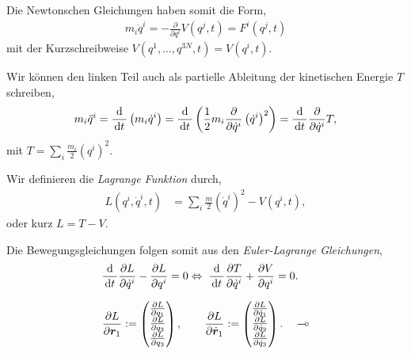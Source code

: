 Die Newtonschen Gleichungen haben somit die Form,
\begin{align*}
m_i\ddot{q}^i  = -\frac{\partial}{\partial q^i} V(q^j,t) = F^i(q^j,t)
\end{align*}
mit der  Kurzschreibweise $V(q^1,\ldots,q^{3N},t) = V(q^i,t)$.

Wir können den linken Teil auch als partielle Ableitung der kinetischen Energie
$T$ schreiben,
\begin{align*}
m_i \ddot{q}^i = \frac{\mathrm{d}}{\,\mathrm{d} t\,}\left(m_i \dot{q}^i\right)
= \frac{\mathrm{d}}{\,\mathrm{d} t\,}\left(\frac{1}{2}m_i
\frac{\partial}{\partial \dot{q}^i}\left(\dot{q}^i\right)^2\right)
= \frac{\mathrm{d}}{\,\mathrm{d} t\,}\frac{\partial}{\partial \dot{q}^i}T,
\end{align*}
mit $T = \sum_i \frac{m_i}{2}\left(q^i\right)^2$.

Wir definieren die \emph{Lagrange Funktion} durch,
\begin{align*}
L(q^i,\dot{q}^i,t) &= \sum_i \frac{m}{2} \left(\dot{q}^i\right)^2 - V(q^i,t),
\end{align*}
oder kurz $L=T-V$.

Die Bewegungsgleichungen folgen somit aus den \emph{Euler-Lagrange
Gleichungen},
\begin{align*}
&\frac{\mathrm{d}}{\,\mathrm{d} t\,}\frac{\partial L}{\partial \dot{q}^i} - \frac{\partial L
}{\partial q^i} = 0 \Leftrightarrow\; \frac{\mathrm{d}}{\,\mathrm{d} t\,}\frac{\partial T}{\partial\dot{q}^i} +
\frac{\partial V}{\partial q^i} = 0.
\end{align*}

\begin{bemn}
\begin{align*}
\frac{\partial L}{\partial \bm{r}_1} :=
\begin{pmatrix}
\frac{\partial L}{\partial q_1}\\ \frac{\partial L}{\partial q_2}\\
\frac{\partial L}{\partial q_3}
\end{pmatrix},\qquad 
\frac{\partial L}{\partial \dot{\bm{r}}_1} :=
\begin{pmatrix}
\frac{\partial L}{\partial \dot{q}_1}\\ \frac{\partial L}{\partial \dot{q}_2}\\
\frac{\partial L}{\partial \dot{q}_3}
\end{pmatrix}.\quad\multimap
\end{align*}
\end{bemn}

